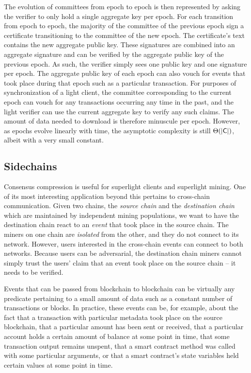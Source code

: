 The evolution of committees from epoch to epoch is then represented by asking
the verifier to only hold a single aggregate key per epoch. For each transition
from epoch to epoch, the majority of the committee of the previous epoch sign
a certificate transitioning to the committee of the new epoch. The certificate's
text contains the new aggregate public key. These signatures are combined into
an aggregate signature and can be verified by the aggregate public key of the
previous epoch. As such, the verifier simply sees one public key and one
signature per epoch. The aggregate public key of each epoch can also vouch for
events that took place during that epoch such as a particular transaction. For
purposes of synchronization of a light client, the committee corresponding to
the current epoch can vouch for any transactions occurring any time in the past,
and the light verifier can use the current aggregate key to verify any such
claims. The amount of data needed to download is therefore minuscule per epoch.
However, as epochs evolve linearly with time, the asymptotic complexity is still
$\Theta(|\mathsf{C}|)$, albeit with a very small constant.

\subsection{Sidechains}

Consensus compression is useful for superlight clients and superlight mining.
One of its most interesting application beyond this pertains to cross-chain
communication. Given two chains, the \emph{source chain} and the
\emph{destination chain} which are maintained by independent mining populations,
we want to have the destination chain react to an \emph{event} that took place
in the source chain. The miners on one chain are \emph{isolated} from the other,
and they do not connect to its network. However, users interested in the
cross-chain events can connect to both networks. Because users can be
adversarial, the destination chain miners cannot simply trust the users' claim
that an event took place on the source chain -- it needs to be verified.

Events that can be passed from blockchain to blockchain can be virtually any
predicate pertaining to a small amount of data such as a constant number of
transactions or blocks. In practice, these events can be, for example, about the
fact that a transaction with particular metadata took place on the source
blockchain, that a particular amount has been sent or received, that a
particular account holds a certain amount of balance at some point in time, that
some transaction output remains unspent, that a smart contract method was
called with some particular arguments, or that a smart contract's state
variables held certain values at some point in time.

